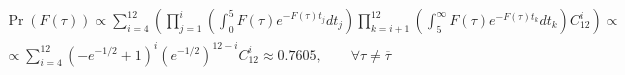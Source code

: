 \documentclass[a4paper,12pt,leqno]{article}
\begin{document}
\begin{align}
	\Pr(F(\tau))
	\propto
	\sum_{i=4}^{12} \left(
		\prod_{j=1}^{i} \left(
			\int_{0}^{5} F(\tau)e^{-F(\tau)t_j}dt_j
		\right)
		\prod_{k=i+1}^{12} \left(
			\int_{5}^{\infty} F(\tau) e^{-F(\tau)t_k}dt_k
		\right)
		C_{12}^i
	\right)
	\propto \\
	\propto
	\sum_{i=4}^{12} \left(
		-e^{-1/2}+1
	\right)^i
	\left(
		e^{-1/2}
	\right)^{12-i} C_{12}^i \approx 0.7605,
	\qquad \forall \tau \ne \overline{\tau} \nonumber
\end{align}
\end{document}
